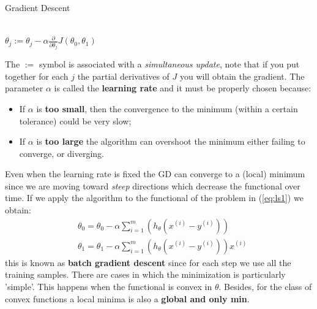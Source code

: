 \begin{algorithm}[h]
    \caption{Gradient Descent}
    \begin{algorithmic}
        \\
           $\theta_j:=\theta_j-\alpha{\frac{\partial}{\partial{\theta_j}} J(\theta_0, \theta_1)}$
        \EndWhile
    \end{algorithmic}
\end{algorithm}

\noindent
The $:=$ symbol is associated with a \textit{simultaneous update}, note that if you put together for each $j$ the partial derivatives of $J$ you will obtain the gradient. The parameter $\alpha$ is called the \textbf{learning rate} and it must be properly chosen because:
\begin{itemize}
    \itemsep-0.2em
    \item If $\alpha$ is \textbf{too small}, then the convergence to the minimum (within a certain tolerance) could be very slow;
    \item If $\alpha$ is \textbf{too large} the algorithm can overshoot the minimum either failing to converge, or diverging.
\end{itemize}
Even when the learning rate is fixed the GD can converge to a (local) minimum since we are moving toward \textit{steep} directions which decrease the functional over time. If we apply the algorithm to the functional of the problem in (\ref{eq:ls1}) we obtain:
\begin{equation}
    \begin{aligned}
        &\theta_0=\theta_0-\alpha{\sum_{i=1}^{m}{(h_\theta(x^{(i)}-y^{(i)}))}}\\
        &\theta_1=\theta_1-\alpha{\sum_{i=1}^{m}{(h_\theta(x^{(i)}-y^{(i)}))} x^{(i)}}
    \end{aligned}
\end{equation}
this is known as \textbf{batch gradient descent} since for each step we use all the training samples. There are cases in which the minimization is particularly 'simple'. This happens when the functional is convex in $\theta$. Besides, for the class of convex functions a local minima is also a \textbf{global and only min}.

